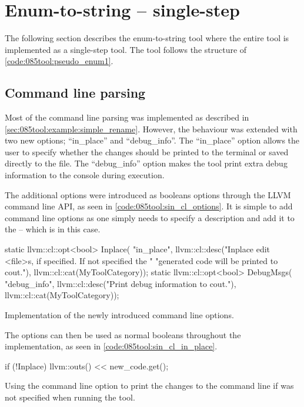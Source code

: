 \section{Enum-to-string -- single-step}
The following section describes the enum-to-string tool where the entire tool is implemented as a single-step tool. The tool follows the structure of \cref{code:085tool:pseudo_enum1}.

\subsection{Command line parsing}
Most of the command line parsing was implemented as described in \cref{sec:085tool:example:simple_rename}. However, the behaviour was extended with two new options; ``in\_place'' and ``debug\_info''.
The ``in\_place'' option allows the user to specify whether the changes should be printed to the terminal or saved directly to the file.
The ``debug\_info'' option makes the tool print extra debug information to the console during execution.

The additional options were introduced as booleans options through the LLVM command line API, as seen in \cref{code:085tool:sin_cl_options}. It is simple to add command line options as one simply needs to specify a description and add it to the  -- which is  in this case.

\begin{listing}[H]
    \begin{cppcode}
static llvm::cl::opt<bool> Inplace(
    "in_place",
    llvm::cl::desc("Inplace edit <file>s, if specified. If not specified the "
                   "generated code will be printed to cout."),
    llvm::cl::cat(MyToolCategory));
static llvm::cl::opt<bool> DebugMsgs(
    "debug_info", llvm::cl::desc("Print debug information to cout."),
    llvm::cl::cat(MyToolCategory));
    \end{cppcode}
    \caption{Implementation of the newly introduced command line options.}
    \label{code:085tool:sin_cl_options}
\end{listing}

The options can then be used as normal booleans throughout the implementation, as seen in \cref{code:085tool:sin_cl_in_place}.

\begin{listing}[H]
    \begin{cppcode}
if (!Inplace) {
    llvm::outs() << new_code.get();
}
    \end{cppcode}
    \caption{Using the  command line option to print the changes to the command line if  was not specified when running the tool.}
    \label{code:085tool:sin_cl_in_place}
\end{listing}

